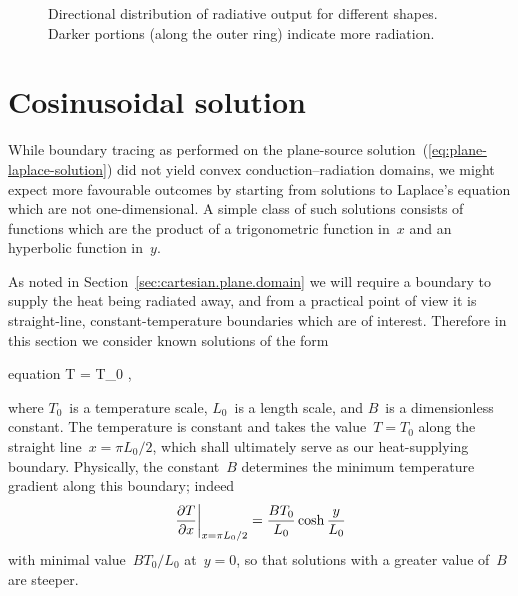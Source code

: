 \begin{figure}
  \newcommand*{\subfigurewidth}{0.33\textwidth}
  \centering
  \hspace*{\fill}
  \begin{subfigure}[t]{\subfigurewidth}
  \end{subfigure}
    \hfill
  \begin{subfigure}[t]{\subfigurewidth}
  \end{subfigure}
  \hspace*{\fill}
  \caption{
    Directional distribution of radiative output for different shapes.
    Darker portions (along the outer ring) indicate more radiation.
  }
  \label{fig:plane-directional-dependence-geometry}
\end{figure}

\begin{figure}
\end{figure}

\section{Cosinusoidal solution}
\label{sec:cartesian.cosine}

While boundary tracing as performed on
the plane-source solution~(\ref{eq:plane-laplace-solution})
did not yield convex conduction--radiation domains,
we might expect more favourable outcomes
by starting from solutions to Laplace's equation
which are not one-dimensional.
A simple class of such solutions consists of functions which are the product
of a trigonometric function in~$x$ and an hyperbolic function in~$y$.

As noted in Section~\ref{sec:cartesian.plane.domain}
we will require a boundary to supply the heat being radiated away,
and from a practical point of view it is
straight-line, constant-temperature boundaries which are of interest.
Therefore in this section we consider known solutions of the form
\begin{important}{equation}
  T = T_0 ,
  \label{eq:cosine-laplace-solution}
\end{important}
where $T_0$~is a temperature scale, $L_0$~is a length scale,
and $B$~is a dimensionless constant.
The temperature is constant and takes the value~$T = T_0$
along the straight line~$x = \pi L_0/2$,
which shall ultimately serve as our heat-supplying boundary.
Physically, the constant~$B$ determines
the minimum temperature gradient along this boundary;
indeed
\begin{equation}
  \eval*{\pder{T}{x}}_{x = \pi L_0/2} = \frac{B T_0}{L_0} \cosh\frac{y}{L_0}
  \label{eq:cosine-laplace-solution-dirichlet-slope}
\end{equation}
with minimal value~$B T_0 / L_0$ at~$y = 0$,
so that solutions with a greater value of~$B$ are steeper.

